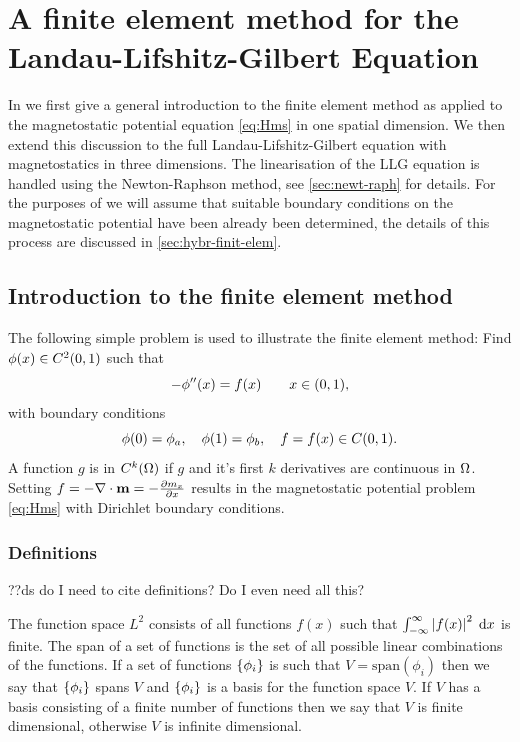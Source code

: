 \chapter{A finite element method for the Landau-Lifshitz-Gilbert Equation}
\label{sec:galerk-meth-llg}

In  we first give a general introduction to the finite element method as applied to the magnetostatic potential equation \cref{eq:Hms} in one spatial dimension.
We then extend this discussion to the full Landau-Lifshitz-Gilbert equation with magnetostatics in three dimensions.
The linearisation of the LLG equation is handled using the Newton-Raphson method, see \cref{sec:newt-raph} for details.
For the purposes of  we will assume that suitable boundary conditions on the magnetostatic potential have been already been determined, the details of this process are discussed in \cref{sec:hybr-finit-elem}.

\section{Introduction to the finite element method}
\label{sec:intr-finite-ele-diff}

The following simple problem is used to illustrate the finite element method:
Find $\phi(x)\in C^{2}(0,1)$ such that
\begin{equation}
  -\phi''(x) = f(x) \qquad x \in (0,1),
  \label{eq:poisson1}
\end{equation}
with boundary conditions
\begin{equation}
  \phi(0)=\phi_{a},\quad \phi(1)=\phi_{b},\quad f=f(x)\in C(0,1).
\end{equation}
A function $g$ is in $C^{k}(\Omega)$ if $g$ and it's first $k$ derivatives are continuous in $\Omega$.
Setting $f = -\nabla \cdot \mathbf{m} = -\frac{\partial m_x}{\partial x}$ results in the magnetostatic potential problem \cref{eq:Hms} with Dirichlet boundary conditions.


\subsection{Definitions}
\label{sec:fem-definitions}

??ds do I need to cite definitions? Do I even need all this?

The function space $L^{2}$ consists of all functions $f(x)$ such that $\int_{-\infty}^{\infty}\left|{f(x)} \right|^{2} {\; \mathrm{{d}}} x$ is finite.
The span of a set of functions is the set of all possible linear combinations of the functions. 
If a set of functions $\left\{ {\phi_i} \right\}$ is such that $V=\text{span}(\phi_i)$ then we say that $\left\{ {\phi_i} \right\}$ spans $V$ and $\left\{ {\phi_i} \right\}$ is a basis for the function space $V$.
If $V$ has a basis consisting of a finite number of functions then we say that $V$ is finite dimensional, otherwise $V$ is infinite dimensional.

